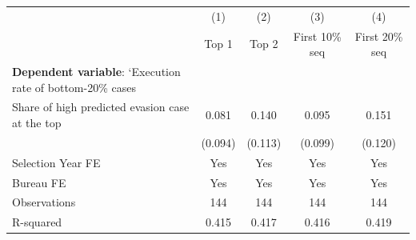 {
\def\sym#1{\ifmmode^{#1}\else\(^{#1}\)\fi}
\begin{tabular}{l*{4}{c}}
\toprule
            &\multicolumn{1}{c}{(1)}&\multicolumn{1}{c}{(2)}&\multicolumn{1}{c}{(3)}&\multicolumn{1}{c}{(4)}\\
            &\multicolumn{1}{c}{Top 1}&\multicolumn{1}{c}{Top 2}&\multicolumn{1}{c}{First 10\% seq}&\multicolumn{1}{c}{First 20\% seq}\\
\midrule
\textbf{Dependent variable}: `Execution rate of bottom-20\% cases&                     &                     &                     &                     \\
\addlinespace
Share of high predicted evasion case at the top&       0.081         &       0.140         &       0.095         &       0.151         \\
            &     (0.094)         &     (0.113)         &     (0.099)         &     (0.120)         \\
\midrule
Selection Year FE&         Yes         &         Yes         &         Yes         &         Yes         \\
Bureau FE   &         Yes         &         Yes         &         Yes         &         Yes         \\
Observations&         144         &         144         &         144         &         144         \\
R-squared   &       0.415         &       0.417         &       0.416         &       0.419         \\
\bottomrule
\end{tabular}
}
